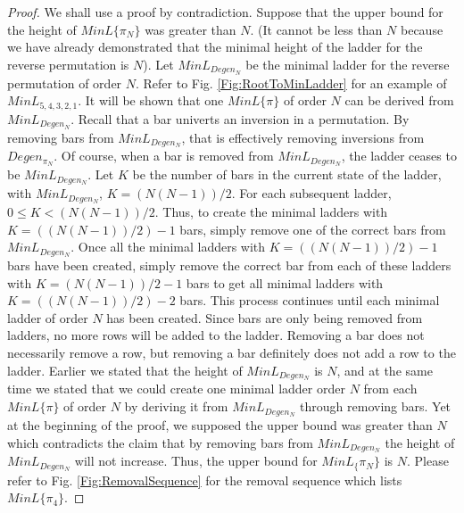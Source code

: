    \begin{proof}
       We shall use a proof by contradiction. Suppose that the upper bound for the height of $MinL\{\pi_{N}\}$ was greater than $N$. (It cannot be less than $N$ because 
       we have already demonstrated that the minimal height of the ladder for the reverse permutation is $N$). Let $MinL_{Degen_{N}}$ be the 
       minimal ladder for the reverse permutation of order $N$. Refer to Fig. \ref{Fig:RootToMinLadder} for an example of $MinL_{5,4,3,2,1}$. It will be shown that one 
       $MinL\{\pi\}$ of order $N$ can be derived from $MinL_{Degen_{N}}$.
       Recall that a bar univerts an inversion in a permutation. By removing bars from $MinL_{Degen_{N}}$, that is effectively removing 
       inversions from $Degen_{\pi_{N}}$. Of course, when a bar is removed from  $MinL_{Degen_{N}}$, the ladder ceases to be  $MinL_{Degen_{N}}$. 
       Let $K$ be the number of bars in the current state of the ladder, with $MinL_{Degen_{N}}$, $K=(N(N-1))/2$. For each subsequent 
       ladder, $0 \leq K < (N(N-1))/2$. Thus, to create the minimal ladders with $K=((N(N-1))/2)-1$ bars, simply remove one of the correct bars from $MinL_{Degen_{N}}$. 
       Once all the minimal ladders with  $K=((N(N-1))/2)-1$ bars have been created, simply remove the correct bar from each of these ladders with 
        $K=(N(N-1))/2-1$ bars to get all minimal ladders with  $K=((N(N-1))/2)-2$ bars.
       This process continues until each minimal ladder of order $N$ has been created. Since bars are only being removed from ladders, no more rows 
       will be added to the ladder. Removing a bar does not necessarily remove a row, but removing a bar definitely does not add a row to the ladder. Earlier we stated that 
       the height of $MinL_{Degen_{N}}$ is $N$, and at the same time we stated that we could create one minimal ladder order $N$ from each $MinL\{\pi\}$ of order $N$
       by deriving it from $MinL_{Degen_{N}}$ 
       through removing bars. Yet at the beginning of the proof, 
       we supposed the upper bound was greater than $N$ which contradicts the claim that by removing bars from  
       $MinL_{Degen_{N}}$ the height of  $MinL_{Degen_{N}}$ will not increase. Thus, the upper bound for $MinL_\{\pi_{N}\}$ is $N$. 
       Please refer to Fig. \ref{Fig:RemovalSequence} for the removal sequence which lists $MinL\{\pi_{4}\}$. 

   \end{proof}\pagebreak

